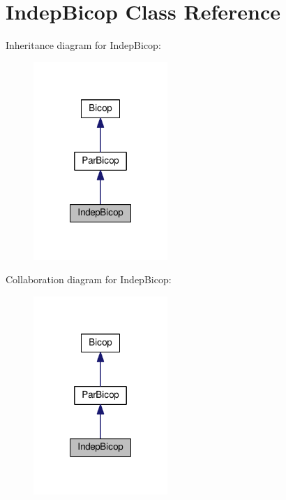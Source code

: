 \hypertarget{class_indep_bicop}{\section{Indep\+Bicop Class Reference}
\label{class_indep_bicop}
}


Inheritance diagram for Indep\+Bicop\+:
\nopagebreak
\begin{figure}[H]
\begin{center}
\leavevmode
\includegraphics[width=144pt]{class_indep_bicop__inherit__graph}
\end{center}
\end{figure}


Collaboration diagram for Indep\+Bicop\+:
\nopagebreak
\begin{figure}[H]
\begin{center}
\leavevmode
\includegraphics[width=144pt]{class_indep_bicop__coll__graph}
\end{center}
\end{figure}
